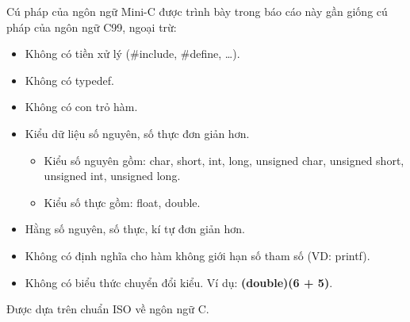 \documentclass[../report.tex]{subfiles}
\begin{document}
Cú pháp của ngôn ngữ Mini-C được trình bày 
trong báo cáo này gần giống cú pháp của ngôn ngữ C99, ngoại trừ: 
\begin{itemize}
    \item Không có tiền xử lý (\#include, \#define, \ldots).
    \item Không có typedef. 
    \item Không có con trỏ hàm. 
    \item Kiểu dữ liệu số nguyên, số thực đơn giản hơn. 
        \begin{itemize}
        \item Kiểu số nguyên gồm: char, short, int, long, 
            unsigned char, unsigned short, 
            unsigned int, unsigned long.
        \item Kiểu số thực gồm:  float, double.
        \end{itemize}
    \item Hằng số nguyên, số thực, kí tự đơn giản hơn. 
    \item Không có định nghĩa cho 
        hàm không giới hạn số tham số (VD: printf). 
    \item Không có biểu thức chuyển đổi kiểu. Ví dụ: 
        \textbf{(double)(6 + 5)}.
\end{itemize}
Được dựa trên chuẩn ISO về ngôn ngữ C. \cite{iso}
\end{document}
